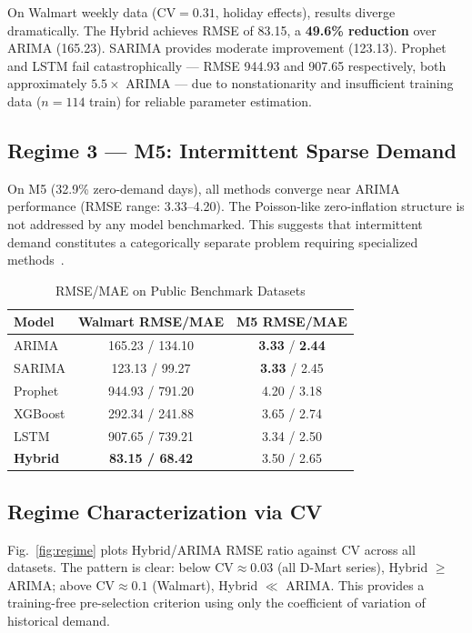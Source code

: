 \documentclass[journal]{IEEEtran}
\begin{document}
On Walmart weekly data (CV$=0.31$, holiday effects), results diverge dramatically. The Hybrid achieves RMSE of 83.15, a \textbf{49.6\% reduction} over ARIMA (165.23). SARIMA provides moderate improvement (123.13). Prophet and LSTM fail catastrophically — RMSE 944.93 and 907.65 respectively, both approximately $5.5\times$ ARIMA — due to nonstationarity and insufficient training data ($n{=}114$ train) for reliable parameter estimation.

\subsection{Regime 3 — M5: Intermittent Sparse Demand}

On M5 (32.9\% zero-demand days), all methods converge near ARIMA performance (RMSE range: 3.33–4.20). The Poisson-like zero-inflation structure is not addressed by any model benchmarked. This suggests that intermittent demand constitutes a categorically separate problem requiring specialized methods~\cite{croston1972forecasting}.

\begin{table}[htbp]
\centering
\caption{RMSE/MAE on Public Benchmark Datasets}
\label{tab:public}
\begin{tabular}{lcc}
\toprule
\textbf{Model} & \textbf{Walmart} RMSE/MAE & \textbf{M5} RMSE/MAE \\
\midrule
ARIMA   & 165.23 / 134.10 & \textbf{3.33} / \textbf{2.44} \\
SARIMA  & 123.13 / 99.27  & \textbf{3.33} / 2.45 \\
Prophet & 944.93 / 791.20 & 4.20 / 3.18 \\
XGBoost & 292.34 / 241.88 & 3.65 / 2.74 \\
LSTM    & 907.65 / 739.21 & 3.34 / 2.50 \\
\textbf{Hybrid} & \textbf{83.15 / 68.42} & 3.50 / 2.65 \\
\bottomrule
\end{tabular}
\end{table}

\subsection{Regime Characterization via CV}
\label{sec:regime}

Fig.~\ref{fig:regime} plots Hybrid/ARIMA RMSE ratio against CV across all datasets. The pattern is clear: below CV$\approx$0.03 (all D-Mart series), Hybrid $\geq$ ARIMA; above CV$\approx 0.1$ (Walmart), Hybrid $\ll$ ARIMA. This provides a training-free pre-selection criterion using only the coefficient of variation of historical demand.
\end{document}
